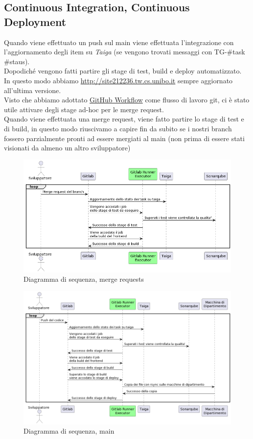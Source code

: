 \documentclass{article}
\begin{document}
\subsection{Continuous Integration, Continuous Deployment}
Quando viene effettuato un push sul main viene effettuata l'integrazione con l'aggiornamento degli item su \textit{Taiga} (se vengono trovati messaggi con TG-\#task \#staus). \\
Dopodich\'e vengono fatti partire gli stage di test, build e deploy automatizzato. \\
In questo modo abbiamo \href{http://site212236.tw.cs.unibo.it/}{http://site212236.tw.cs.unibo.it} sempre aggiornato all'ultima versione. \\
Visto che abbiamo adottato \href{https://docs.github.com/en/get-started/quickstart/github-flow}{GitHub Workflow} come flusso di lavoro git, ci \`e stato utile attivare degli stage ad-hoc per le merge request. \\
Quando viene effettuata una merge request, viene fatto partire lo stage di test e di build, in questo modo riuscivamo a capire fin da subito se i nostri branch fossero parzialmente pronti ad essere mergiati al main (non prima di essere stati visionati da almeno un altro sviluppatore)
\begin{figure}[H]
    \centering
    \includegraphics[scale=0.38]{diagrammi/mergecicd.png}
    \caption{Diagramma di sequenza, merge requests}
    \label{fig:deployment}
\end{figure}
\begin{figure}[H]
    \centering
    \includegraphics[scale=0.38]{diagrammi/cicd.png}
    \caption{Diagramma di sequenza, main}
    \label{fig:deployment}
\end{figure}
\end{document}

